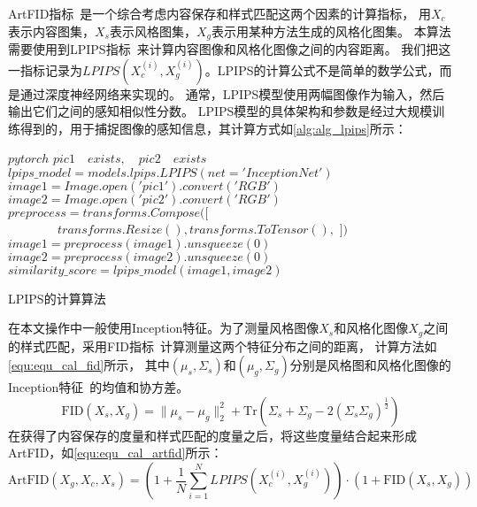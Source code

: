\par ArtFID指标~\cite{wright2022artfid}是一个综合考虑内容保存和样式匹配这两个因素的计算指标，
用$X_c$表示内容图集，$X_s$表示风格图集，$X_g$表示用某种方法生成的风格化图集。
本算法需要使用到LPIPS指标~\cite{zhang2018unreasonable}来计算内容图像和风格化图像之间的内容距离。
我们把这一指标记录为\(LPIPS(X_c^{(i)},X_g^{(i)})\)。LPIPS的计算公式不是简单的数学公式，而是通过深度神经网络来实现的。
通常，LPIPS模型使用两幅图像作为输入，然后输出它们之间的感知相似性分数。
LPIPS模型的具体架构和参数是经过大规模训练得到的，用于捕捉图像的感知信息，其计算方式如\autoref{alg:alg_lpips}所示：
\begin{algorithm}[H]
    \begin{algorithmic} %
        \REQUIRE $pytorch$
        \ENSURE $pic1 \quad exists, \quad pic2 \quad exists$
        \STATE $lpips\_model = models.lpips.LPIPS(net='InceptionNet')$
        \STATE $image1 = Image.open('pic1').convert('RGB')$
        \STATE $image2 = Image.open('pic2').convert('RGB')$
        \STATE $preprocess = transforms.Compose([$
        \STATE $\quad \quad \quad \quad transforms.Resize(),transforms.ToTensor(),$
        \STATE $])$
        \STATE $image1 = preprocess(image1).unsqueeze(0)$
        \STATE $image2 = preprocess(image2).unsqueeze(0)$
        \STATE $similarity\_score = lpips\_model(image1, image2)$
        
    \end{algorithmic}
    \caption{\label{alg:alg_lpips}LPIPS的计算算法}
\end{algorithm}
\par 在本文操作中一般使用Inception特征。为了测量风格图像$X_s$和风格化图像$X_g$之间的样式匹配，采用FID指标~\cite{heusel2017gans}计算测量这两个特征分布之间的距离，
计算方法如\autoref{equ:equ_cal_fid}所示，
其中\((\mu_s,\Sigma_s)\text{和}(\mu_g,\Sigma_g)\)分别是风格图和风格化图像的Inception特征~\cite{szegedy2016rethinking}的均值和协方差。
\begin{equation}
    \label{equ:equ_cal_fid}
    \mathrm{FID}(X_s,X_g)=\parallel\mu_s-\mu_g\parallel_2^2+\mathrm{Tr}(\Sigma_s+\Sigma_g-2(\Sigma_s\Sigma_g)^{\frac12})
\end{equation}
在获得了内容保存的度量和样式匹配的度量之后，将这些度量结合起来形成ArtFID，如\autoref{equ:equ_cal_artfid}所示：
\begin{equation}
    \label{equ:equ_cal_artfid}
    \mathrm{ArtFID}(X_g,X_c,X_s)=\left(1+\frac{1}{N}\sum_{i=1}^{N} LPIPS(X_c^{(i)},X_g^{(i)})\right)\cdot\left(1+\mathrm{FID}(X_s,X_g)\right)
\end{equation}
